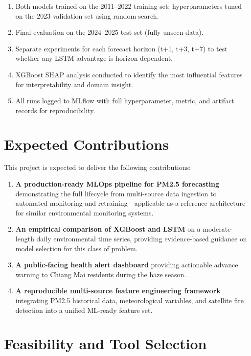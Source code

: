 \documentclass[12pt,a4paper]{report}
\begin{document}
\begin{enumerate}
  \item Both models trained on the 2011--2022 training set; hyperparameters tuned on the 2023 validation set using random search.
  \item Final evaluation on the 2024--2025 test set (fully unseen data).
  \item Separate experiments for each forecast horizon (t+1, t+3, t+7) to test whether any LSTM advantage is horizon-dependent.
  \item XGBoost SHAP analysis conducted to identify the most influential features for interpretability and domain insight.
  \item All runs logged to MLflow with full hyperparameter, metric, and artifact records for reproducibility.
\end{enumerate}

\section{Expected Contributions}

This project is expected to deliver the following contributions:

\begin{enumerate}
  \item \textbf{A production-ready MLOps pipeline for PM2.5 forecasting} demonstrating the full lifecycle from multi-source data ingestion to automated monitoring and retraining---applicable as a reference architecture for similar environmental monitoring systems.
  \item \textbf{An empirical comparison of XGBoost and LSTM} on a moderate-length daily environmental time series, providing evidence-based guidance on model selection for this class of problem.
  \item \textbf{A public-facing health alert dashboard} providing actionable advance warning to Chiang Mai residents during the haze season.
  \item \textbf{A reproducible multi-source feature engineering framework} integrating PM2.5 historical data, meteorological variables, and satellite fire detection into a unified ML-ready feature set.
\end{enumerate}

\section{Feasibility and Tool Selection}
\end{document}
